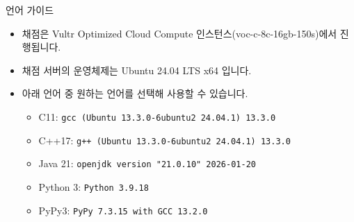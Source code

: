 {
    \indent
    \Large
    
    언어 가이드
}

\begin{itemize}[noitemsep]

    \item 채점은 Vultr Optimized Cloud Compute 인스턴스(voc-c-8c-16gb-150s)에서 진행됩니다.
    \item 채점 서버의 운영체제는 Ubuntu 24.04 LTS x64 입니다.
    \item 아래 언어 중 원하는 언어를 선택해 사용할 수 있습니다.
    
    \begin{itemize}[noitemsep,topsep=0pt]
        \item C11: \texttt{gcc (Ubuntu 13.3.0-6ubuntu2~24.04.1) 13.3.0} %
        \item C++17: \texttt{g++ (Ubuntu 13.3.0-6ubuntu2~24.04.1) 13.3.0} %
        \item Java 21: \texttt{openjdk version "21.0.10" 2026-01-20} %
        \item Python 3: \texttt{Python 3.9.18} %
        \item PyPy3: \texttt{PyPy 7.3.15 with GCC 13.2.0} %
        

\end{itemize}
\end{itemize}
